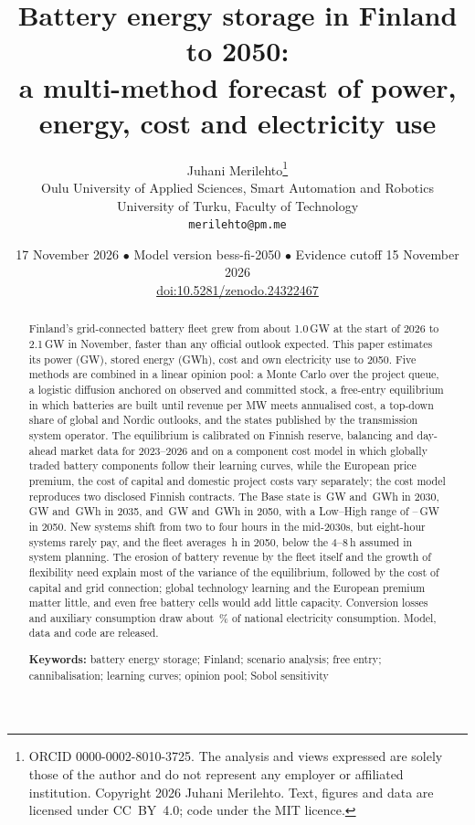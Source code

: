 \documentclass[11pt]{article}
\title{\textbf{Battery energy storage in Finland to 2050:\\
a multi-method forecast of power, energy, cost and electricity use}}
\author{Juhani Merilehto\thanks{ORCID 0000-0002-8010-3725. The analysis and views expressed are solely those of the author and do not represent any employer or affiliated institution. Copyright \textcopyright{} 2026 Juhani Merilehto. Text, figures and data are licensed under CC~BY~4.0; code under the MIT licence.}\\[2pt]
\small Oulu University of Applied Sciences, Smart Automation and Robotics\\
\small University of Turku, Faculty of Technology\\
\small \texttt{merilehto@pm.me}}
\date{\small 17 November 2026 $\bullet$ Model version bess-fi-2050 \val{version} $\bullet$ Evidence cutoff 15 November 2026\\
\small \href{https://doi.org/10.5281/zenodo.24322467}{doi:10.5281/zenodo.24322467}}
\begin{document}
\maketitle
\thispagestyle{empty}

\begin{abstract}
\noindent
Finland's grid-connected battery fleet grew from about 1.0\,GW at the start of 2026 to 2.1\,GW in November, faster than any official outlook expected.
This paper estimates its power (GW), stored energy (GWh), cost and own electricity use to 2050.
Five methods are combined in a linear opinion pool: a Monte Carlo over the project queue, a logistic diffusion anchored on observed and committed stock, a free-entry equilibrium in which batteries are built until revenue per MW meets annualised cost, a top-down share of global and Nordic outlooks, and the states published by the transmission system operator.
The equilibrium is calibrated on Finnish reserve, balancing and day-ahead market data for 2023--2026 and on a component cost model in which globally traded battery components follow their learning curves, while the European price premium, the cost of capital and domestic project costs vary separately; the cost model reproduces two disclosed Finnish contracts.
The Base state is \,GW and \,GWh in 2030, \,GW and \,GWh in 2035, and \,GW and \,GWh in 2050, with a Low--High range of --\,GW in 2050.
New systems shift from two to four hours in the mid-2030s, but eight-hour systems rarely pay, and the fleet averages \,h in 2050, below the 4--8\,h assumed in system planning.
The erosion of battery revenue by the fleet itself and the growth of flexibility need explain most of the variance of the equilibrium, followed by the cost of capital and grid connection; global technology learning and the European premium matter little, and even free battery cells would add little capacity.
Conversion losses and auxiliary consumption draw about \,\% of national electricity consumption.
Model, data and code are released.

\medskip\noindent\textbf{Keywords:} battery energy storage; Finland; scenario analysis; free entry; cannibalisation; learning curves; opinion pool; Sobol sensitivity
\end{abstract}

\end{document}
